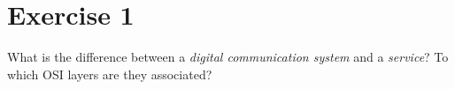 {}
\section*{Exercise 1}

\begin{question}
	What is the difference between a \emph{digital communication system} and a \emph{service}? To which OSI layers are they associated?
\end{question}